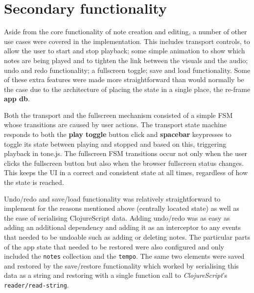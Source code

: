 \documentclass[12pt]{report}
\begin{document}
\chapter{Secondary functionality}
\label{sec:org3192fc0}
Aside from the core functionality of note creation and editing, a number of
other use cases were covered in the implementation. This includes transport
controls, to allow the user to start and stop playback; some simple animation to
show which notes are being played and to tighten the link between the visuals
and the audio; undo and redo functionality; a fullscreen toggle; save and load
functionality. Some of these extra features were made more straightforward than
would normally be the case due to the architecture of placing the state in a
single place, the re-frame \textbf{app db}.

Both the transport and the fullscreen mechanism consisted of a simple FSM whose
transitions are caused by user actions. The transport state machine responds to
both the \textbf{play toggle} button click and \textbf{spacebar} keypresses to toggle its state
between playing and stopped and based on this, triggering playback in tone.js.
The fullscreen FSM transitions occur not only when the user clicks the
fullscreen button but also when the browser fullscreen status changes. This
keeps the UI in a correct and consistent state at all times, regardless of how
the state is reached.

Undo/redo and save/load functionality was relatively straightforward to
implement for the reasons mentioned above (centrally located state) as well as
the ease of serialising ClojureScript data. Adding undo/redo was as easy as
adding an additional dependency and adding it as an interceptor to any events
that needed to be undoable such as adding or deleting notes. The particular
parts of the app state that needed to be restored were also configured and only
included the \texttt{notes} collection and the \texttt{tempo}. The same two elements were
saved and restored by the save/restore functionality which worked by serialising
this data as a string and restoring with a single function call to
\emph{ClojureScript}'s \texttt{reader/read-string}.
\end{document}
